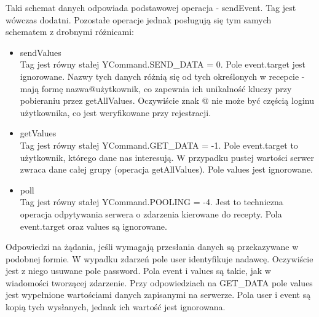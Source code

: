 \documentclass[11pt,a4paper,polish,thesis]{dcsbook}
\begin{document}
Taki schemat danych odpowiada podstawowej operacja - sendEvent. Tag jest wówczas dodatni.
Pozostałe operacje jednak posługują się tym samych schematem z drobnymi różnicami:
\begin{itemize}
\item{sendValues} \\
Tag jest równy stałej YCommand.SEND\_DATA = 0. Pole event.target jest ignorowane. Nazwy tych danych różnią się od tych określonych w recepcie - mają formę nazwa@użytkownik, co zapewnia ich unikalność kluczy przy pobieraniu przez getAllValues. Oczywiście znak @ nie może być częścią loginu użytkownika, co jest weryfikowane przy rejestracji. 
 \item{getValues} \\
Tag jest równy stałej YCommand.GET\_DATA = -1. Pole event.target to użytkownik, którego dane nas interesują. W przypadku pustej wartości serwer zwraca dane całej grupy (operacja getAllValues). Pole values jest ignorowane.
\item{poll} \\
Tag jest równy stałej YCommand.POOLING = -4. Jest to techniczna operacja odpytywania serwera o zdarzenia kierowane do recepty. Pola event.target oraz values są ignorowane.
\end{itemize}
Odpowiedzi na żądania, jeśli wymagają przesłania danych są przekazywane w podobnej formie.
W wypadku zdarzeń pole user identyfikuje nadawcę. Oczywiście jest z niego usuwane pole password. Pola event i values są takie, jak w wiadomości tworzącej zdarzenie. 
Przy odpowiedziach na GET\_DATA pole values jest wypełnione wartościami danych zapisanymi na serwerze. Pola user i event są kopią tych wysłanych, jednak ich wartość jest ignorowana. 
\end{document}
